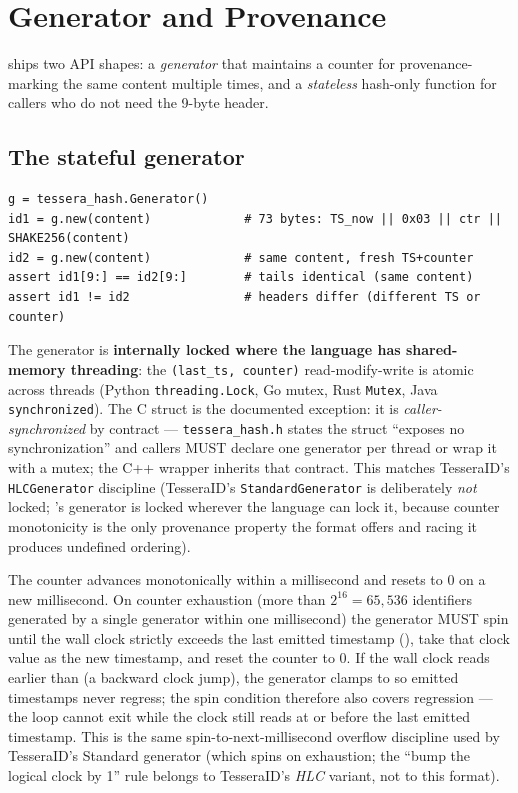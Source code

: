 \section{Generator and Provenance}
\label{sec:generator}

\tesserahash{} ships two API shapes: a \emph{generator} that maintains a counter for provenance-marking the same content multiple times, and a \emph{stateless} hash-only function for callers who do not need the 9-byte header.

\subsection{The stateful generator}

\begin{lstlisting}[language=Pseudocode]
g = tessera_hash.Generator()
id1 = g.new(content)             # 73 bytes: TS_now || 0x03 || ctr || SHAKE256(content)
id2 = g.new(content)             # same content, fresh TS+counter
assert id1[9:] == id2[9:]        # tails identical (same content)
assert id1 != id2                # headers differ (different TS or counter)
\end{lstlisting}

The generator is \textbf{internally locked where the language has shared-memory threading}: the \texttt{(last\_ts, counter)} read-modify-write is atomic across threads (Python \texttt{threading.Lock}, Go mutex, Rust \texttt{Mutex}, Java \texttt{synchronized}). The C struct is the documented exception: it is \emph{caller-synchronized} by contract --- \texttt{tessera\_hash.h} states the struct ``exposes no synchronization'' and callers MUST declare one generator per thread or wrap it with a mutex; the C++ wrapper inherits that contract. This matches TesseraID's \texttt{HLCGenerator} discipline (TesseraID's \texttt{StandardGenerator} is deliberately \emph{not} locked; \tesserahash{}'s generator is locked wherever the language can lock it, because counter monotonicity is the only provenance property the format offers and racing it produces undefined ordering).

The counter advances monotonically within a millisecond and resets to 0 on a new millisecond. On counter exhaustion (more than $2^{16} = 65{,}536$ identifiers generated by a single generator within one millisecond) the generator MUST spin until the wall clock strictly exceeds the last emitted timestamp (), take that clock value as the new timestamp, and reset the counter to 0. If the wall clock reads earlier than  (a backward clock jump), the generator clamps to  so emitted timestamps never regress; the spin condition  therefore also covers regression --- the loop cannot exit while the clock still reads at or before the last emitted timestamp. This is the same spin-to-next-millisecond overflow discipline used by TesseraID's Standard generator (which spins on exhaustion; the ``bump the logical clock by 1'' rule belongs to TesseraID's \emph{HLC} variant, not to this format).


